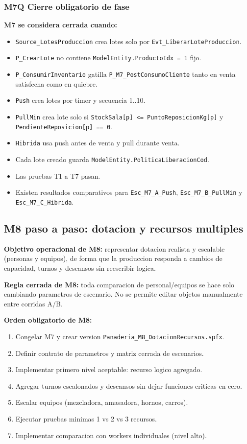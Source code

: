\documentclass[11pt]{article}
\newcommand{\simio}[1]{\texttt{#1}}
\newcommand{\state}[1]{\texttt{#1}}
\newcommand{\proc}[1]{\texttt{#1}}
\begin{document}
\subsubsection{M7Q Cierre obligatorio de fase}
\textbf{M7 se considera cerrada cuando:}
\begin{itemize}
  \item \simio{Source\_LotesProduccion} crea lotes solo por \simio{Evt\_LiberarLoteProduccion}.
  \item \proc{P\_CrearLote} no contiene \state{ModelEntity.ProductoIdx = 1} fijo.
  \item \proc{P\_ConsumirInventario} gatilla \proc{P\_M7\_PostConsumoCliente} tanto en venta satisfecha como en quiebre.
  \item \simio{Push} crea lotes por timer y secuencia 1..10.
  \item \simio{PullMin} crea lote solo si \state{StockSala[p] <= PuntoReposicionKg[p]} y \state{PendienteReposicion[p] == 0}.
  \item \simio{Hibrida} usa push antes de venta y pull durante venta.
  \item Cada lote creado guarda \state{ModelEntity.PoliticaLiberacionCod}.
  \item Las pruebas T1 a T7 pasan.
  \item Existen resultados comparativos para \simio{Esc\_M7\_A\_Push}, \simio{Esc\_M7\_B\_PullMin} y \simio{Esc\_M7\_C\_Hibrida}.
\end{itemize}

\subsection{M8 paso a paso: dotacion y recursos multiples}
\textbf{Objetivo operacional de M8:} representar dotacion realista y escalable (personas y equipos), de forma que la produccion responda a cambios de capacidad, turnos y descansos sin reescribir logica.

\textbf{Regla cerrada de M8:} toda comparacion de personal/equipos se hace solo cambiando parametros de escenario. No se permite editar objetos manualmente entre corridas A/B.

\textbf{Orden obligatorio de M8:}
\begin{enumerate}
  \item Congelar M7 y crear version \simio{Panaderia\_M8\_DotacionRecursos.spfx}.
  \item Definir contrato de parametros y matriz cerrada de escenarios.
  \item Implementar primero nivel aceptable: recurso logico agregado.
  \item Agregar turnos escalonados y descansos sin dejar funciones criticas en cero.
  \item Escalar equipos (mezcladora, amasadora, hornos, carros).
  \item Ejecutar pruebas minimas 1 vs 2 vs 3 recursos.
  \item Implementar comparacion con workers individuales (nivel alto).
\end{enumerate}
\end{document}
